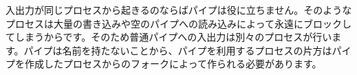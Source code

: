 入出力が同じプロセスから起きるのならばパイプは役に立ちません。そのようなプロセスは大量の書き込みや空のパイプへの読み込みによって永遠にブロックしてしまうからです。そのため普通パイプへの入出力は別々のプロセスが行います。パイプは名前を持たないことから、パイプを利用するプロセスの片方はパイプを作成したプロセスからのフォークによって作られる必要があります。
